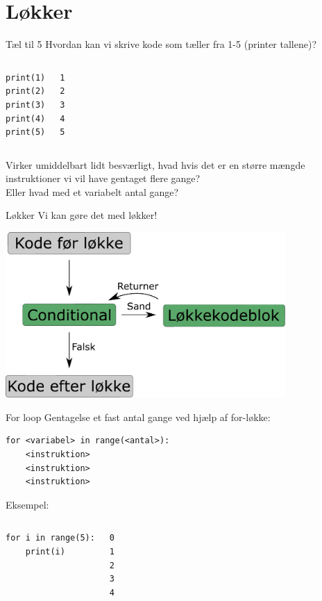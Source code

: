 \section{Løkker}

\begin{frame}[fragile]{Tæl til 5}
	Hvordan kan vi skrive kode som tæller fra 1-5 (printer tallene)?
	\pause
	\begin{columns}
		\begin{lstlisting}[style=python]
print(1)
print(2)
print(3)
print(4)
print(5)
		\end{lstlisting}
		\begin{lstlisting}[style=python]
1
2
3
4
5
		\end{lstlisting}
	\end{columns}
	Virker umiddelbart lidt besværligt, hvad hvis det er en større mængde instruktioner vi vil have gentaget flere gange?\\
	Eller hvad med et variabelt antal gange?
\end{frame}

\begin{frame}[fragile]{Løkker}
	Vi kan gøre det med løkker!
	\begin{center}
		\includegraphics[width=0.8\textwidth]{figs/loop.pdf}
	\end{center}
\end{frame}


\begin{frame}[fragile]{For loop}
	Gentagelse et fast antal gange ved hjælp af for-løkke:
	\begin{lstlisting}[style=python]
for <variabel> in range(<antal>):
	<instruktion>
	<instruktion>
	<instruktion>
	\end{lstlisting}
	\pause
	Eksempel:
	\begin{columns}
		\column{0.4\textwidth}
		\begin{lstlisting}[style=python]
for i in range(5):
	print(i)
		\end{lstlisting}
		\column{0.4\textwidth}
		\begin{lstlisting}[style=python]
0
1
2
3
4
		\end{lstlisting}
	\end{columns}
\end{frame}


